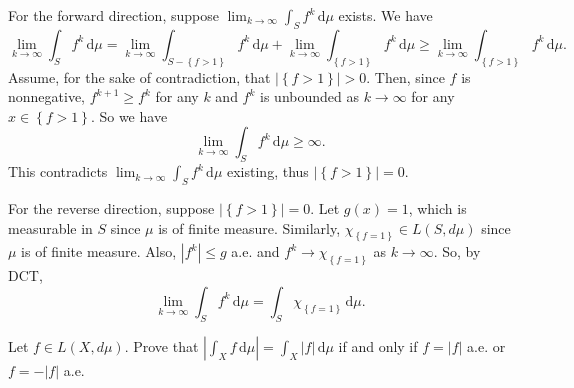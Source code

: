 \begin{solution}
  For the forward direction, suppose $\lim_{k \to \infty} \int_{S} \! f^{k} \, \mathrm{d} \mu$ exists.
  We have 
  \[
    \lim_{k \to \infty} \int_{S} \! f^{k} \, \mathrm{d} \mu = \lim_{k \to \infty} \int_{S-\left\{ f > 1 \right\}} \! f^{k} \, \mathrm{d} \mu + \lim_{k \to \infty} \int_{\left\{ f > 1 \right\}} \! f^{k} \, \mathrm{d} \mu \geq \lim_{k \to \infty} \int_{\left\{ f > 1 \right\}} \! f^{k} \, \mathrm{d} \mu
  .\] 
  Assume, for the sake of contradiction, that $\left| \left\{ f > 1 \right\} \right| > 0$.
  Then, since $f$ is nonnegative, $f^{k+1} \geq f^{k}$ for any $k$ and $f^{k}$ is unbounded as $k \to \infty$ for any $x \in \left\{ f > 1 \right\}$.
  So we have
  \[
  \lim_{k \to \infty} \int_{S} \! f^{k} \, \mathrm{d} \mu \geq \infty 
  .\] 
  This contradicts $\lim_{k \to \infty} \int_{S} \! f^{k} \, \mathrm{d} \mu$ existing, thus $\left| \left\{ f > 1 \right\} \right| = 0$.

  For the reverse direction, suppose $\left| \left\{ f > 1 \right\} \right| = 0$.
  Let $g(x) = 1$, which is measurable in $S$ since $\mu$ is of finite measure.
  Similarly, $\chi_{\left\{ f = 1 \right\}} \in L\left( S, d \mu \right)$ since $\mu$ is of finite measure.
  Also, $\left| f^{k} \right| \leq g$ a.e. and $f^{k} \to \chi_{\left\{ f = 1 \right\}}$ as $k \to \infty$.
  So, by DCT,
  \[
  \lim_{k \to \infty} \int_{S} \! f^{k} \, \mathrm{d} \mu = \int_{S} \! \chi_{\left\{ f = 1 \right\}} \, \mathrm{d} \mu  
  .\] 
\end{solution}

\pagebreak

\begin{problem}{3}
  Let $f \in L\left( X,d \mu \right)$. Prove that $\left| \int_{X} \! f \, \mathrm{d}\mu  \right| = \int_{X} \! \left| f \right| \, \mathrm{d}\mu $ if and only if $f = \left| f \right|$ a.e. or $f = - \left| f \right|$ a.e.
\end{problem}

